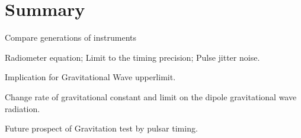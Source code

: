 
\section{Summary}
Compare generations of instruments

Radiometer equation; Limit to the timing precision; Pulse jitter noise.

Implication for Gravitational Wave upperlimit.

Change rate of gravitational constant and limit on the dipole gravitational
wave radiation.

Future prospect of Gravitation test by pulsar timing.
